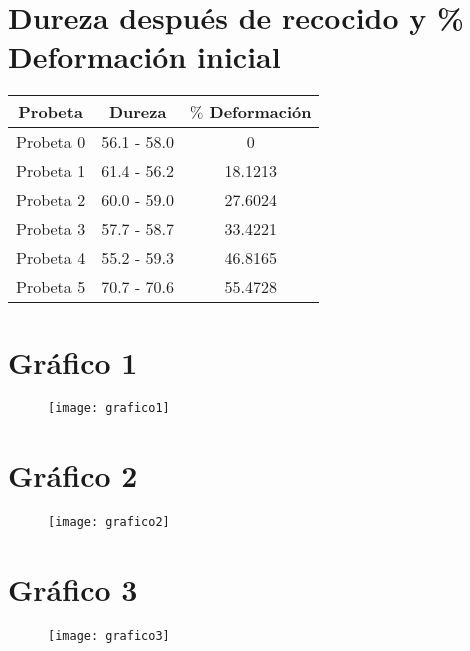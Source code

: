 \documentclass[a4paper,12pt]{report}
\begin{document}
\section{Dureza después de recocido y \% Deformación inicial}
\begin{center}
\begin{tabular}{|c|c|c|}
\hline 
Probeta & Dureza & $\%$ Deformación \\ 
\hline 
Probeta 0 & 56.1 - 58.0 & 0 \\ 
\hline 
Probeta 1 & 61.4 - 56.2 & 18.1213 \\ 
\hline 
Probeta 2 & 60.0 - 59.0 & 27.6024 \\ 
\hline 
Probeta 3 & 57.7 - 58.7 & 33.4221 \\ 
\hline 
Probeta 4 & 55.2 - 59.3 & 46.8165 \\ 
\hline 
Probeta 5 & 70.7 - 70.6 & 55.4728 \\ 
\hline 
\end{tabular} 
\end{center}
\section{Gráfico 1}
\begin{figure}[H]
\begin{center}
\texttt{[image: grafico1]}
\end{center}
\end{figure}
\section{Gráfico 2}
\begin{figure}[H]
\begin{center}
\texttt{[image: grafico2]}
\end{center}
\end{figure}
\section{Gráfico 3}
\begin{figure}[H]
\begin{center}
\texttt{[image: grafico3]}
\end{center}
\end{figure}
\end{document}
